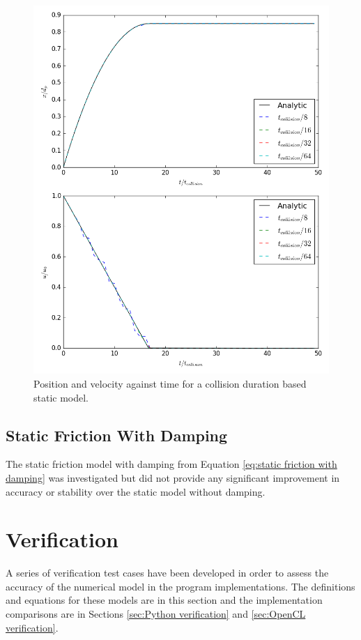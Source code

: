 \documentclass[10pt,a4paper,titlepage]{report}
\begin{document}
\begin{figure}[!ht]
\centering
\includegraphics[scale=0.5]{figures/friction_model/t_col_static.png}
\caption{Position and velocity against time for a collision duration based static model.}
\label{fig:t_col_static}
\end{figure}
\subsection{Static Friction With Damping}
The static friction model with damping from Equation \ref{eq:static friction with damping} was investigated but did not provide any significant improvement in accuracy or stability over the static model without damping.
\section{Verification}
A series of verification test cases have been developed in order to assess the accuracy of the numerical model in the program implementations. The definitions and equations for these models are in this section and the implementation comparisons are in Sections \ref{sec:Python verification} and \ref{sec:OpenCL verification}.
\label{sec:verification}
\end{document}
